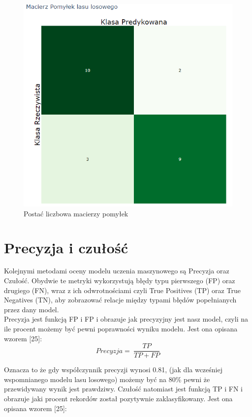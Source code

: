 \documentclass[a4paper,12pt,oneside]{book}
\begin{document}
\begin{figure}[H]
\centering
\includegraphics[scale=0.6]{pxConfMat.png}
\caption{Postać liczbowa macierzy pomyłek}
\end{figure}

\section{Precyzja i czułość}
Kolejnymi metodami oceny modelu uczenia maszynowego są Precyzja oraz Czułość. Obydwie te metryki wykorzystują błędy typu pierwszego (FP) oraz drugiego (FN), wraz z ich odwrotnościami czyli True Positives (TP) oraz True Negatives (TN), aby zobrazować relacje między typami błędów popełnianych przez dany model.\\
Precyzja jest funkcją FP i FP i obrazuje jak precyzyjny jest nasz model, czyli na ile procent możemy być pewni poprawności wyniku modelu. Jest ona opisana wzorem [25]:\\

\begin{equation}
Precyzja=\ \frac{TP}{TP+FP}
\end{equation}


Oznacza to że gdy współczynnik precyzji wynosi 0.81, (jak dla wcześniej wspomnianego modelu lasu losowego) możemy być na 80\% pewni że przewidywany wynik jest prawdziwy.
Czułość natomiast jest funkcją TP i FN i obrazuje jaki procent rekordów został pozytywnie zaklasyfikowany. Jest ona opisana wzorem [25]:
\end{document}
